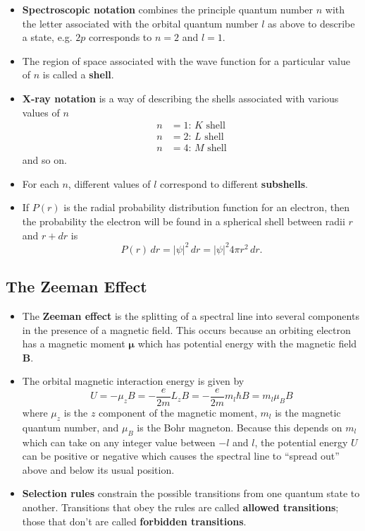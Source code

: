 \documentclass{article}
\begin{document}
\begin{itemize}
  \item \textbf{Spectroscopic notation} combines the principle quantum number $n$ with the letter associated with the orbital quantum number $l$ as above to describe a state, e.g. $2 p$ corresponds to $n = 2$ and $l = 1$.

  \item The region of space associated with the wave function for a particular value of $n$ is called a \textbf{shell}.

  \item \textbf{X-ray notation} is a way of describing the shells associated with various values of $n$ \begin{align*}
          n & = 1 \text{: } K \text{ shell} \\
          n & = 2 \text{: } L \text{ shell} \\
          n & = 4 \text{: } M \text{ shell}
        \end{align*} and so on.

  \item For each $n$, different values of $l$ correspond to different \textbf{subshells}.

  \item If $P(r)$ is the radial probability distribution function for an electron, then the probability the electron will be found in a spherical shell between radii $r$ and $r + d r$ is \[P(r) \,dr = |\psi|^2 \,dr = |\psi|^2 4 \pi r^2 \,dr.\]
\end{itemize}

\subsection{The Zeeman Effect}

\begin{itemize}
  \item The \textbf{Zeeman effect} is the splitting of a spectral line into several components in the presence of a magnetic field. This occurs because an orbiting electron has a magnetic moment $\boldsymbol{\mu}$ which has potential energy with the magnetic field $\mathbf{B}$.

  \item The orbital magnetic interaction energy is given by \[U = -\mu_z B = -\frac{e}{2 m} L_z B = -\frac{e}{2 m} m_l \hbar B = m_l \mu_B B\] where $\mu_z$ is the $z$ component of the magnetic moment, $m_l$ is the magnetic quantum number, and $\mu_B$ is the Bohr magneton. Because this depends on $m_l$ which can take on any integer value between $-l$ and $l$, the potential energy $U$ can be positive or negative which causes the spectral line to ``spread out'' above and below its usual position.

  \item \textbf{Selection rules} constrain the possible transitions from one quantum state to another. Transitions that obey the rules are called \textbf{allowed transitions}; those that don't are called \textbf{forbidden transitions}.
\end{itemize}
\end{document}
